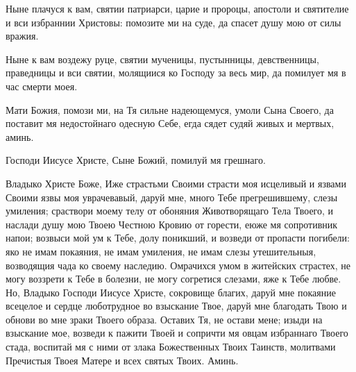 \begin{mymulticols}

Ныне плачуся к вам, святии патриарси, царие и пророцы, апостоли и святителие и вси избраннии Христовы: помозите ми на суде, да спасет душу мою от силы вражия.

\slava

Ныне к вам воздежу руце, святии мученицы, пустынницы, девственницы, праведницы и вси святии, молящиися ко Господу за весь мир, да помилует мя в час смерти моея.

\inyne

Мати Божия, помози ми, на Тя сильне надеющемуся, умоли Сына Своего, да поставит мя недостойнаго одесную Себе, егда сядет судяй живых и мертвых, аминь.


Господи Иисусе Христе, Сыне Божий, помилуй мя грешнаго.

Владыко Христе Боже, Иже страстьми Своими страсти моя исцеливый и язвами Своими язвы моя уврачевавый, даруй мне, много Тебе прегрешившему, слезы умиления; сраствори моему телу от обоняния Животворящаго Тела Твоего, и наслади душу мою Твоею Честною Кровию от горести, еюже мя сопротивник напои; возвыси мой ум к Тебе, долу поникший, и возведи от пропасти погибели: яко не имам покаяния, не имам умиления, не имам слезы утешительныя, возводящия чада ко своему наследию. Омрачихся умом в житейских страстех, не могу воззрети к Тебе в болезни, не могу согретися слезами, яже к Тебе любве. Но, Владыко Господи Иисусе Христе, сокровище благих, даруй мне покаяние всецелое и сердце люботрудное во взыскание Твое, даруй мне благодать Твою и обнови во мне зраки Твоего образа. Оставих Тя, не остави мене; изыди на взыскание мое, возведи к пажити Твоей и сопричти мя овцам избраннаго Твоего стада, воспитай мя с ними от злака Божественных Твоих Таинств, молитвами Пречистыя Твоея Матере и всех святых Твоих. Аминь.

\end{mymulticols}

\mychapterending


